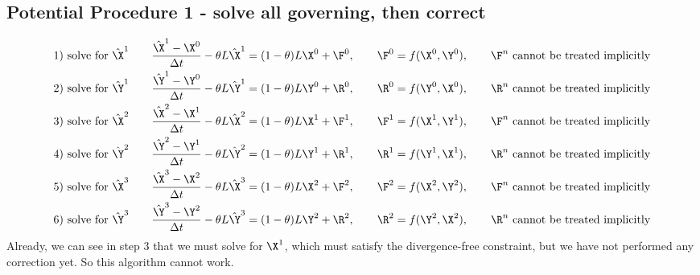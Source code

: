 \documentclass[11pt]{article}
\begin{document}
\subsection{Potential Procedure 1 - solve all governing, then correct}
\begin{equation}\begin{aligned}
&\text{1) solve for }\hat{\X}^{1} \qquad \frac{\hat{\X}^{1}-\X^{0}}{\Delta t} - \theta L\hat{\X}^{1} = (1-\theta) L\X^{0} + \F^0, \qquad \F^0 = f(\X^0,\Y^0), \qquad \F^n \text{ cannot be treated implicitly}\\
&\text{2) solve for }\hat{\Y}^{1} \qquad \frac{\hat{\Y}^{1}-\Y^{0}}{\Delta t} - \theta L\hat{\Y}^{1} = (1-\theta) L\Y^{0} + \R^0, \qquad \R^0 = f(\Y^0,\X^0), \qquad \R^n \text{ cannot be treated implicitly} \\
&\text{3) solve for }\hat{\X}^{2} \qquad \frac{\hat{\X}^{2}-\X^{1}}{\Delta t} - \theta L\hat{\X}^{2} = (1-\theta) L\X^{1} + \F^1, \qquad \F^1 = f(\X^1,\Y^1), \qquad \F^n \text{ cannot be treated implicitly}\\
&\text{4) solve for }\hat{\Y}^{2} \qquad \frac{\hat{\Y}^{2}-\Y^{1}}{\Delta t} - \theta L\hat{\Y}^{2} = (1-\theta) L\Y^{1} + \R^1, \qquad \R^1 = f(\Y^1,\X^1), \qquad \R^n \text{ cannot be treated implicitly} \\
&\text{5) solve for }\hat{\X}^{3} \qquad \frac{\hat{\X}^{3}-\X^{2}}{\Delta t} - \theta L\hat{\X}^{3} = (1-\theta) L\X^{2} + \F^2, \qquad \F^2 = f(\X^2,\Y^2), \qquad \F^n \text{ cannot be treated implicitly}\\
&\text{6) solve for }\hat{\Y}^{3} \qquad \frac{\hat{\Y}^{3}-\Y^{2}}{\Delta t} - \theta L\hat{\Y}^{3} = (1-\theta) L\Y^{2} + \R^2, \qquad \R^2 = f(\Y^2,\X^2), \qquad \R^n \text{ cannot be treated implicitly} \\
\end{aligned}\end{equation}
Already, we can see in step 3 that we must solve for $\X^{1}$, which must satisfy the divergence-free constraint, but we have not performed any correction yet. So this algorithm cannot work.
\end{document}
